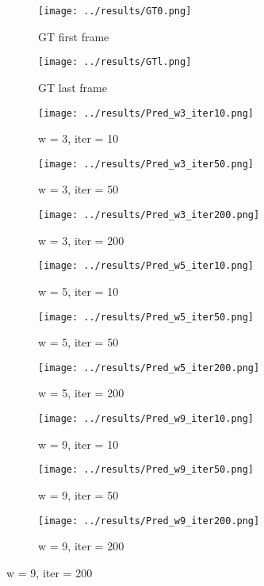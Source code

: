 \documentclass{article}
\begin{document}
\begin{figure}
\label{results}
    \centering
    
	\begin{subfigure}[b]{0.3\textwidth}
		\centering    
        \texttt{[image: ../results/GT0.png]}
        \caption{GT first frame}
    \end{subfigure}
    \begin{subfigure}[b]{0.3\textwidth}
        \centering
        \texttt{[image: ../results/GTl.png]}
        \caption{GT last frame}
    \end{subfigure}%

    \begin{subfigure}[t]{0.3\textwidth}
        \centering
        \texttt{[image: ../results/Pred\_w3\_iter10.png]}
        \caption{w = 3, iter = 10}
    \end{subfigure}
    \begin{subfigure}[t]{0.3\textwidth}
        \centering
        \texttt{[image: ../results/Pred\_w3\_iter50.png]}
        \caption{w = 3, iter = 50}
    \end{subfigure}
    \begin{subfigure}[t]{0.3\textwidth}
        \centering
        \texttt{[image: ../results/Pred\_w3\_iter200.png]}
        \caption{w = 3, iter = 200}
    \end{subfigure}
   
    \begin{subfigure}[t]{0.3\textwidth}
        \centering
        \texttt{[image: ../results/Pred\_w5\_iter10.png]}
        \caption{w = 5, iter = 10}
    \end{subfigure}
    \begin{subfigure}[t]{0.3\textwidth}
        \centering
        \texttt{[image: ../results/Pred\_w5\_iter50.png]}
        \caption{w = 5, iter = 50}
    \end{subfigure}
    \begin{subfigure}[t]{0.3\textwidth}
        \centering
        \texttt{[image: ../results/Pred\_w5\_iter200.png]}
        \caption{w = 5, iter = 200}
    \end{subfigure}

    \begin{subfigure}[t]{0.3\textwidth}
        \centering
        \texttt{[image: ../results/Pred\_w9\_iter10.png]}
        \caption{w = 9, iter = 10}
    \end{subfigure}
    \begin{subfigure}[t]{0.3\textwidth}
        \centering
        \texttt{[image: ../results/Pred\_w9\_iter50.png]}
        \caption{w = 9, iter = 50}
    \end{subfigure}
    \begin{subfigure}[t]{0.3\textwidth}
        \centering
        \texttt{[image: ../results/Pred\_w9\_iter200.png]}
        \caption{w = 9, iter = 200}
    \end{subfigure}


\end{figure}
\end{document}
